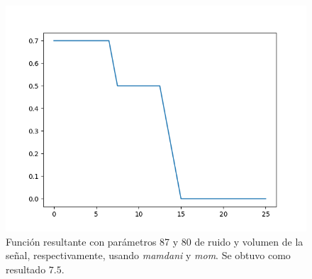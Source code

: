 \documentclass[11pt]{article}
\begin{document}
\begin{figure}[ht]
	\centering
	\includegraphics[width=.5\textwidth]{images/Eval_R87_V80.png}			
	\caption{Funci\'on resultante con par\'ametros 87 y 80 de ruido y volumen de la se\~nal, respectivamente, usando \emph{mamdani} y \emph{mom}. Se obtuvo como resultado $7.5$.}
	\label{fig:result}	
\end{figure}
\end{document}
